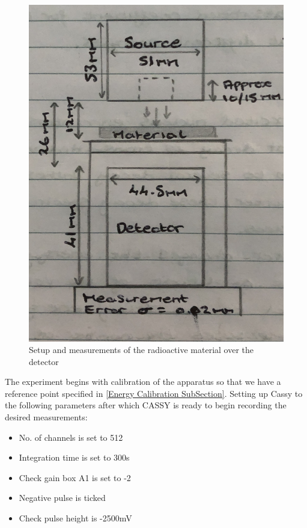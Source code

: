 \documentclass[12pt]{article}
\begin{document}
\begin{figure}[H]
\centering
\includegraphics[scale=0.12]{Images/IMG_0338.jpg}
\caption{Setup and measurements of the radioactive material over the detector \cite{Exp.C-Lab_book}}
\label{Setup of Apparatus}
\end{figure}

The experiment begins with calibration of the apparatus so that we have a reference point specified in \cref{Energy Calibration SubSection}. Setting up Cassy to the following parameters \cite{Exp.C-2020} after which CASSY is ready to begin recording the desired measurements:\\
\begin{itemize}
    \item No. of channels is set to 512
    \item Integration time is set to 300s
    \item Check gain box A1 is set to -2
    \item Negative pulse is ticked
    \item Check pulse height is -2500mV
\end{itemize}
\end{document}
